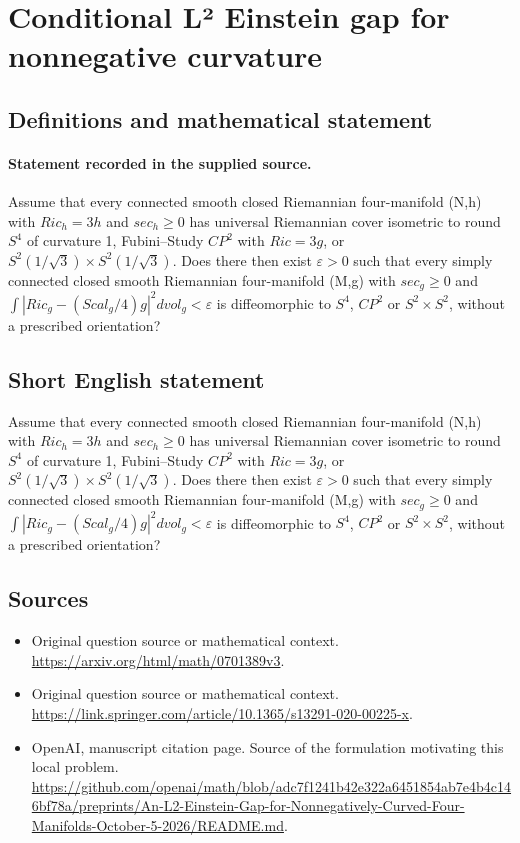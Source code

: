 \documentclass[11pt]{article}
\begin{document}
\section*{Conditional L² Einstein gap for nonnegative curvature}\label{30007139}
\subsection{Definitions and mathematical statement}
\paragraph{Statement recorded in the supplied source.}
Assume that every connected smooth closed Riemannian four-manifold (N,h) with $Ric_h=3h$ and $sec_h\geq 0$ has universal Riemannian cover isometric to round $S^{4}$ of curvature 1, Fubini–Study $CP^{2}$ with $Ric=3g$, or $S^{2}(1/\surd 3)×S^{2}(1/\surd 3)$. Does there then exist $\varepsilon >0$ such that every simply connected closed smooth Riemannian four-manifold (M,g) with $sec_g\geq 0$ and $\int |Ric_g-(Scal_g/4)g|^{2}dvol_g<\varepsilon $ is diffeomorphic to $S^{4}$, $CP^{2}$ or $S^{2}×S^{2}$, without a prescribed orientation?
\subsection{Short English statement}
Assume that every connected smooth closed Riemannian four-manifold (N,h) with $Ric_h=3h$ and $sec_h\geq 0$ has universal Riemannian cover isometric to round $S^{4}$ of curvature 1, Fubini–Study $CP^{2}$ with $Ric=3g$, or $S^{2}(1/\surd 3)×S^{2}(1/\surd 3)$. Does there then exist $\varepsilon >0$ such that every simply connected closed smooth Riemannian four-manifold (M,g) with $sec_g\geq 0$ and $\int |Ric_g-(Scal_g/4)g|^{2}dvol_g<\varepsilon $ is diffeomorphic to $S^{4}$, $CP^{2}$ or $S^{2}×S^{2}$, without a prescribed orientation?
\subsection{Sources}
\begin{itemize}
\item[S1] Original question source or mathematical context.
\url{https://arxiv.org/html/math/0701389v3}.
\item[S2] Original question source or mathematical context.
\url{https://link.springer.com/article/10.1365/s13291-020-00225-x}.
\item[S3] OpenAI, manuscript citation page. Source of the formulation motivating this local problem.
\url{https://github.com/openai/math/blob/adc7f1241b42e322a6451854ab7e4b4c146bf78a/preprints/An-L2-Einstein-Gap-for-Nonnegatively-Curved-Four-Manifolds-October-5-2026/README.md}.
\end{itemize}
\end{document}
